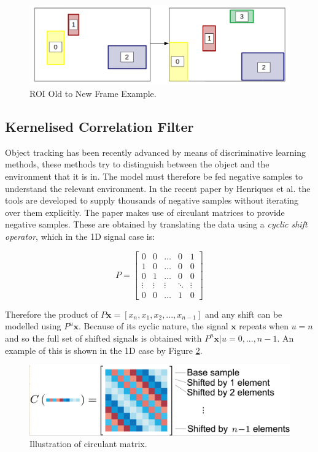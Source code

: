 \documentclass[a4paper,11pt,notitlepage]{article}
\begin{document}
\noindent \begin{figure}[h!]
	\includegraphics[width = 1.0\hsize]{figures/roi_match.png}
	\caption{ROI Old to New Frame Example.}
	\label{roi_match}
\end{figure}


\subsection{Kernelised Correlation Filter}

Object tracking has been recently advanced by means of discriminative learning methods, these methods try to distinguish between the object and the environment that it is in. The model must therefore be fed negative samples to understand the relevant environment. In the recent paper by Henriques et al. \cite{kcf} the tools are developed to supply thousands of negative samples without iterating over them explicitly. The paper makes use of circulant matrices to provide negative samples. These are obtained by translating the data using a \textit{cyclic shift operator}, which in the 1D signal case is:

\begin{equation}
P = 
\begin{bmatrix}
0 & 0 & \dots & 0 & 1 \\
1 & 0 & \dots & 0 & 0 \\
0 & 1 & \dots & 0 & 0 \\
\vdots & \vdots & \vdots & \ddots & \vdots \\
0 & 0 & \dots & 1 & 0
\end{bmatrix}
\end{equation} 

Therefore the product of $P\mathbf{x} = [x_{n},x_{1},x_{2},...,x_{n-1}]$ and any shift can be modelled using $P^{u}\mathbf{x}$. Because of its cyclic nature, the signal $\mathbf{x}$ repeats when $u=n$ and so the full set of shifted signals is obtained with ${P^{u}\mathbf{x} | u=0,...,n-1}$. An example of this is shown in the 1D case by Figure \ref{circular_data}.

\noindent \begin{figure}[h!]
	\includegraphics[width = 1.0\hsize]{figures/circular_shift.png}
	\caption{Illustration of circulant matrix.\cite{kcf}}
	\label{circular_data}
\end{figure}
\end{document}
